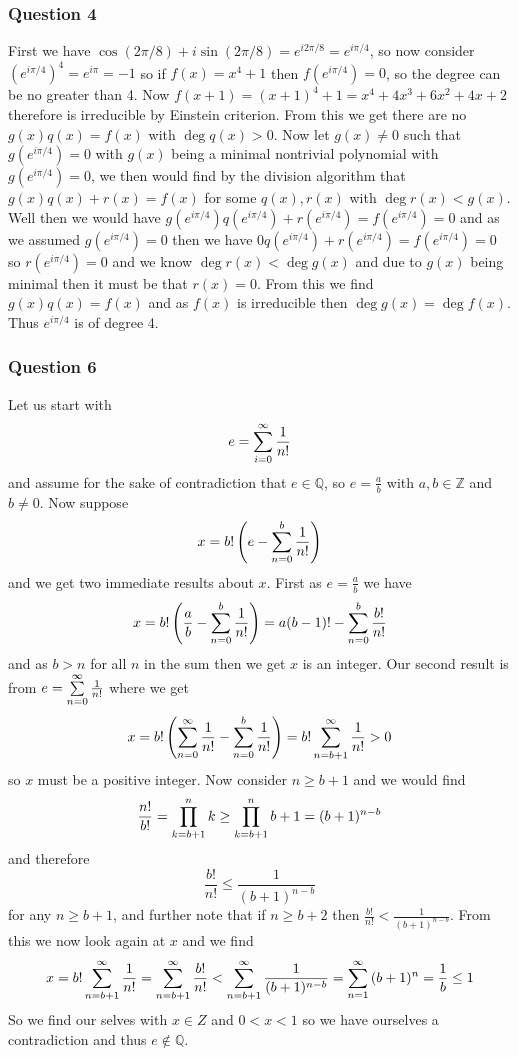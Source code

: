 \documentclass{article}
\begin{document}
\subsubsection{Question 4}
First we have $\cos(2\pi/8)+i\sin(2\pi/8)=e^{i2\pi/8}=e^{i\pi/4}$, so now consider $\left(e^{i\pi/4}\right)^4 = e^{i\pi} = -1$ so if $f(x) = x^4+1$ then $f(e^{i\pi/4}) = 0$, so the degree can be no greater than 4. Now $f(x+1) = (x+1)^4 + 1 = x^4+4x^3+6x^2+4x+2$ therefore is irreducible by Einstein criterion. From this we get there are no $g(x)q(x) = f(x)$ with $\deg q(x) > 0$. Now let $g(x)\not=0$ such that $g(e^{i\pi/4}) = 0$ with $g(x)$ being a minimal nontrivial polynomial with $g(e^{i\pi/4}) = 0$, we then would find by the division algorithm that $g(x)q(x)+r(x) = f(x)$ for some $q(x), r(x)$ with $\deg r(x) < g(x)$. Well then we would have $g(e^{i\pi/4})q(e^{i\pi/4}) +r(e^{i\pi/4}) = f(e^{i\pi/4}) = 0$ and as we assumed $g(e^{i\pi/4}) = 0$ then we have $0q(e^{i\pi/4})+r(e^{i\pi/4}) = f(e^{i\pi/4}) = 0$ so $r(e^{i\pi/4}) = 0$ and we know $\deg r(x) <\deg g(x)$ and due to $g(x)$ being minimal then it must be that $r(x) = 0$. From this we find $g(x)q(x) = f(x)$ and as $f(x)$ is irreducible then $\deg g(x) =\deg f(x)$. Thus $e^{i\pi/4}$ is of degree 4.



\subsubsection{Question 6}
Let us start with $$e=\sum\limits_{i=0}^{\infty}  {\frac 1{n!}} $$ and assume for the sake of contradiction that $e \in \mathbb Q$, so $e=\frac ab$ with $a,b\in\mathbb Z$ and $b\not=0$. Now suppose $$x = b!\left(e-\sum\limits_{n=0}^{b}  {\frac 1{n!}} \right)$$ and we get two immediate results about $x$. First as $e=\frac ab$ we have $$x=b!\left(\frac ab-\sum\limits_{n=0}^{b}  {\frac 1{n!}} \right) = a(b-1)!-\sum\limits_{n=0}^{b}  {\frac{b!}{n!}} $$ and as $b>n$ for all $n$ in the sum then we get $x$ is an integer. Our second result is from $e = \sum\limits_{n=0}^{\infty}  {\frac 1{n!}} $ where we get $$x=b!\left(\sum\limits_{n=0}^{\infty}  {\frac{1}{n!}} -\sum\limits_{n=0}^{b}  {\frac1{n!}} \right) = b!\sum\limits_{n=b+1}^{\infty}  {\frac 1{n!}}  > 0$$ so $x$ must be a positive integer. Now consider $n\ge b+1$ and we would find $$\frac{n!}{b!} = \prod\limits_{k=b+1}^{n} {k}  \ge \prod\limits_{k=b+1}^{n} {b+1}  = (b+1)^{n-b}$$ and therefore $$\frac{b!}{n!}\le \frac{1}{(b+1)^{n-b}}$$ for any $n \ge b+1$, and further note that if $n \ge b+2$ then $\frac{b!}{n!} < \frac{1}{(b+1)^{n-b}}$. From this we now look again at $x$ and we find $$x = b!\sum\limits_{n=b+1}^{\infty}  {\frac 1{n!}}  = \sum\limits_{n=b+1}^{\infty}  {\frac{b!}{n!}}  < \sum\limits_{n=b+1}^{\infty}  {\frac{1}{(b+1)^{n-b}}}  = \sum\limits_{n=1}^{\infty}  {(b+1)^n}  = \frac 1b \le 1$$ So we find our selves with $x\in Z$ and $0<x<1$ so we have ourselves a contradiction and thus $e\not\in\mathbb Q$.
\end{document}
